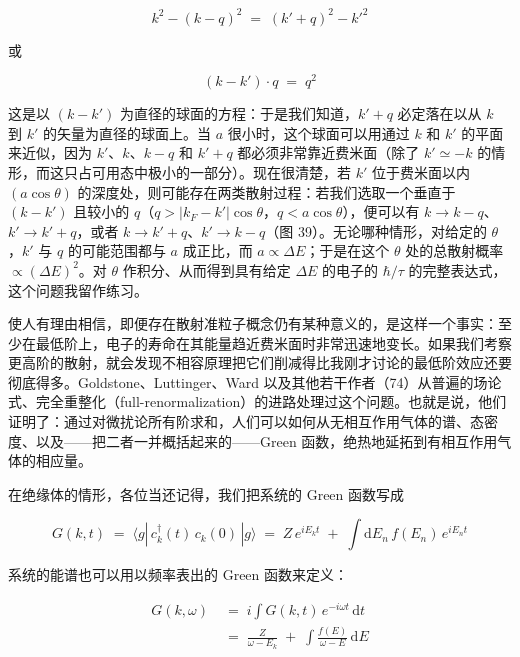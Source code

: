 \begin{equation*}
k^{2} - (k-q)^{2} \;=\; (k'+q)^{2} - k'^{2}
\end{equation*}

或

\begin{equation*}
(k - k') \cdot q \;=\; q^{2}
\end{equation*}

这是以 $(k-k')$ 为直径的球面的方程：于是我们知道，$k'+q$ 必定落在以从 $k$ 到 $k'$ 的矢量为直径的球面上。当 $a$ 很小时，这个球面可以用通过 $k$ 和 $k'$ 的平面来近似，因为 $k'$、$k$、$k-q$ 和 $k'+q$ 都必须非常靠近费米面（除了 $k' \simeq -k$ 的情形，而这只占可用态中极小的一部分）。现在很清楚，若 $k'$ 位于费米面以内 $(a\cos\theta)$ 的深度处，则可能存在两类散射过程：若我们选取一个垂直于 $(k-k')$ 且较小的 $q$（$q > |k_F - k'|\cos\theta$，$q < a\cos\theta$），便可以有 $k \to k-q$、$k' \to k'+q$，或者 $k \to k'+q$、$k' \to k-q$（图 39）。无论哪种情形，对给定的 $\theta$，$k'$ 与 $q$ 的可能范围都与 $a$ 成正比，而 $a \propto \Delta E$；于是在这个 $\theta$ 处的总散射概率 $\propto (\Delta E)^{2}$。对 $\theta$ 作积分、从而得到具有给定 $\Delta E$ 的电子的 $\hbar/\tau$ 的完整表达式，这个问题我留作练习。


使人有理由相信，即便存在散射准粒子概念仍有某种意义的，是这样一个事实：至少在最低阶上，电子的寿命在其能量趋近费米面时非常迅速地变长。如果我们考察更高阶的散射，就会发现不相容原理把它们削减得比我刚才讨论的最低阶效应还要彻底得多。Goldstone、Luttinger、Ward 以及其他若干作者（74）从普遍的场论式、完全重整化（full-renormalization）的进路处理过这个问题。也就是说，他们证明了：通过对微扰论所有阶求和，人们可以如何从无相互作用气体的谱、态密度、以及——把二者一并概括起来的——Green 函数，绝热地延拓到有相互作用气体的相应量。

在绝缘体的情形，各位当还记得，我们把系统的 Green 函数写成

\begin{equation*}
G(k, t) \;=\; \langle g|\, c_k^{\dagger}(t)\, c_k(0)\, |g\rangle
\;=\; Z\, e^{iE_k t} \;+\; \int \mathrm{d}E_n\, f(E_n)\, e^{iE_n t}
\end{equation*}

系统的能谱也可以用以频率表出的 Green 函数来定义：

\begin{align*}
G(k, \omega) \;&=\; i \int G(k, t)\, e^{-i\omega t}\, \mathrm{d}t \\
&=\; \frac{Z}{\omega - E_k} \;+\; \int \frac{f(E)}{\omega - E}\, \mathrm{d}E
\end{align*}

